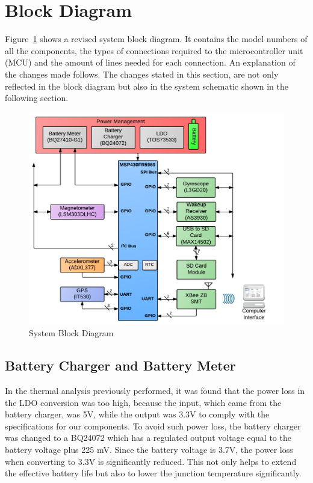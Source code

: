 \section{Block Diagram}

Figure~\ref{fig:blockDiagram} shows a revised system block diagram. It contains the model numbers of all the components, the types of connections required to the microcontroller unit (MCU) and the amount of lines needed for each connection. An explanation of the changes made follows. The changes stated in this section, are not only reflected in the block diagram but also in the system schematic shown in the following section.

\begin{figure}[H]
\centering
	\includegraphics[width=\textwidth]{img/blockDiagram}
	\caption{System Block Diagram \label{fig:blockDiagram}}
\end{figure}

\subsection{Battery Charger and Battery Meter}

In the thermal analysis previously performed, it was found that the power loss in the LDO conversion was too high, because the input, which came from the battery charger, was 5V, while the output was 3.3V to comply with the specifications for our components.  To avoid such power loss, the battery charger was changed to a BQ24072 which has a regulated output voltage equal to the battery voltage plus 225 mV.  Since the battery voltage is 3.7V, the power loss when converting to 3.3V is significantly reduced.  This not only helps to extend the effective battery life but also to lower the junction temperature significantly.

